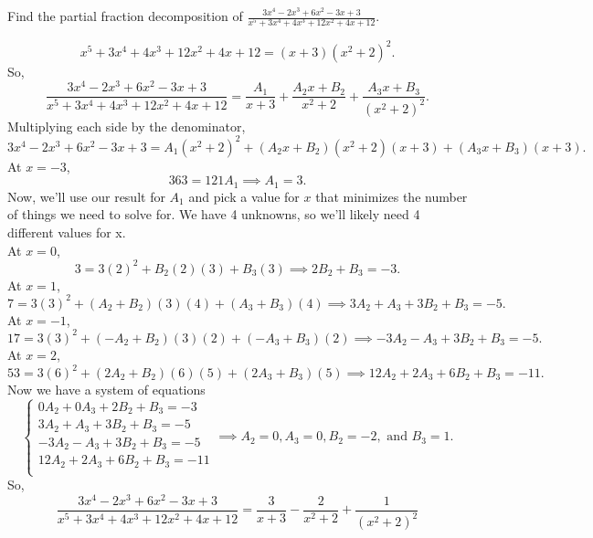 \begin{example}
	Find the partial fraction decomposition of $\frac{3x^4-2x^3+6x^2-3x+3}{x^5+3x^4+4x^3+12x^2+4x+12}$.
\end{example}
\begin{answer}
	\begin{equation*}
		x^5+3x^4+4x^3+12x^2+4x+12 = (x+3)(x^2+2)^2.
	\end{equation*}
	So,
	\begin{equation*}
		\frac{3x^4-2x^3+6x^2-3x+3}{x^5+3x^4+4x^3+12x^2+4x+12} = \frac{A_1}{x+3}+\frac{A_2x+B_2}{x^2+2}+\frac{A_3x+B_3}{(x^2+2)^2}.
	\end{equation*}
	Multiplying each side by the denominator,
	\begin{equation*}
		3x^4-2x^3+6x^2-3x+3 = A_1(x^2+2)^2+(A_2x+B_2)(x^2+2)(x+3)+(A_3x+B_3)(x+3).
	\end{equation*}
	At $x=-3$,
	\begin{equation*}
		363 = 121A_1 \implies A_1 = 3.
	\end{equation*}
	Now, we'll use our result for $A_1$ and pick a value for $x$ that minimizes the number of things we need to solve for.
	We have 4 unknowns, so we'll likely need 4 different values for x.\\
	At $x=0$,
	\begin{equation*}
		3 = 3(2)^2 + B_2(2)(3)+B_3(3) \implies 2B_2 + B_3 = -3.
	\end{equation*}
	At $x=1$,
	\begin{equation*}
		7 = 3(3)^2 + (A_2+B_2)(3)(4) + (A_3+B_3)(4) \implies 3A_2 + A_3 + 3B_2 + B_3 = -5.
	\end{equation*}
	At $x=-1$,
	\begin{equation*}
		17 = 3(3)^2 + (-A_2+B_2)(3)(2) + (-A_3+B_3)(2) \implies -3A_2 - A_3 + 3B_2 + B_3 = -5.
	\end{equation*}
	At $x=2$,
	\begin{equation*}
		53 = 3(6)^2 + (2A_2+B_2)(6)(5) + (2A_3+B_3)(5) \implies 12A_2 + 2A_3 + 6B_2 + B_3 = -11.
	\end{equation*}
	Now we have a system of equations
	\begin{equation*}
		\begin{cases}
			0A_2  + 0A_3 + 2B_2 + B_3 = -3 \\
			3A_2  + A_3  + 3B_2 + B_3 = -5 \\
			-3A_2 - A_3  + 3B_2 + B_3 = -5 \\
			12A_2 + 2A_3 + 6B_2 + B_3 = -11 \\
		\end{cases}
		\implies A_2 = 0, A_3 = 0, B_2 = -2, \text{ and } B_3 = 1.
	\end{equation*}
	So,
	\begin{equation*}
		\frac{3x^4-2x^3+6x^2-3x+3}{x^5+3x^4+4x^3+12x^2+4x+12} = \frac{3}{x+3}-\frac{2}{x^2+2}+\frac{1}{(x^2+2)^2}
	\end{equation*}
\end{answer}